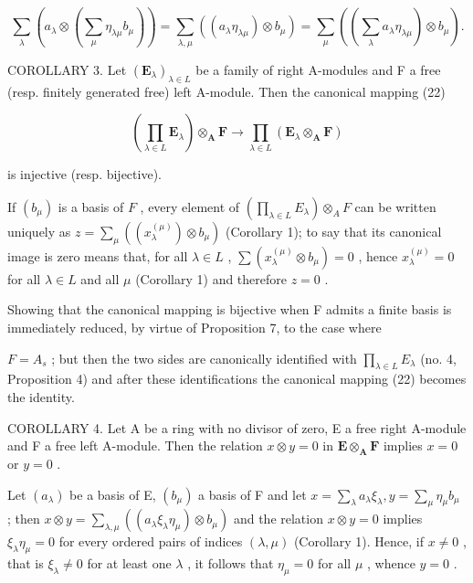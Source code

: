 \[
\sum_ {\lambda} \left(a _ {\lambda} \otimes \left(\sum_ {\mu} \eta_ {\lambda \mu} b _ {\mu}\right)\right) = \sum_ {\lambda , \mu} \left((a _ {\lambda} \eta_ {\lambda \mu}) \otimes b _ {\mu}\right) = \sum_ {\mu} \left(\left(\sum_ {\lambda} a _ {\lambda} \eta_ {\lambda \mu}\right) \otimes b _ {\mu}\right).
\]

COROLLARY 3. Let \((\mathbf{E}_{\lambda})_{\lambda \in L}\) be a family of right A-modules and F a free (resp. finitely generated free) left A-module. Then the canonical mapping (22)

\[
\left(\prod_ {\lambda \in L} \mathbf {E} _ {\lambda}\right) \otimes_ {\mathbf {A}} \mathbf {F} \rightarrow \prod_ {\lambda \in L} \left(\mathbf {E} _ {\lambda} \otimes_ {\mathbf {A}} \mathbf {F}\right)
\]

is injective (resp. bijective).

If \((b_{\mu})\) is a basis of \(F\) , every element of \(\left(\prod_{\lambda \in L} E_{\lambda}\right) \otimes_{A} F\) can be written uniquely as \(z = \sum_{\mu} ((x_{\lambda}^{(\mu)}) \otimes b_{\mu})\) (Corollary 1); to say that its canonical image is zero means that, for all \(\lambda \in L\) , \(\sum (x_{\lambda}^{(\mu)} \otimes b_{\mu}) = 0\) , hence \(x_{\lambda}^{(\mu)} = 0\) for all \(\lambda \in L\) and all \(\mu\) (Corollary 1) and therefore \(z = 0\) .

Showing that the canonical mapping is bijective when F admits a finite basis is immediately reduced, by virtue of Proposition 7, to the case where

\(F = A_{s}\) ; but then the two sides are canonically identified with \(\prod_{\lambda \in L} E_{\lambda}\) (no. 4, Proposition 4) and after these identifications the canonical mapping (22) becomes the identity.

COROLLARY 4. Let A be a ring with no divisor of zero, E a free right A-module and F a free left A-module. Then the relation \(x \otimes y = 0\) in \(\mathbf{E} \otimes_{\mathbf{A}} \mathbf{F}\) implies \(x = 0\) or \(y = 0\) .

Let \((a_{\lambda})\) be a basis of E, \((b_{\mu})\) a basis of F and let \(x = \sum_{\lambda} a_{\lambda} \xi_{\lambda}, y = \sum_{\mu} \eta_{\mu} b_{\mu}\) ; then \(x \otimes y = \sum_{\lambda, \mu} ((a_{\lambda} \xi_{\lambda} \eta_{\mu}) \otimes b_{\mu})\) and the relation \(x \otimes y = 0\) implies \(\xi_{\lambda} \eta_{\mu} = 0\) for every ordered pairs of indices \((\lambda, \mu)\) (Corollary 1). Hence, if \(x \neq 0\) , that is \(\xi_{\lambda} \neq 0\) for at least one \(\lambda\) , it follows that \(\eta_{\mu} = 0\) for all \(\mu\) , whence \(y = 0\) .

